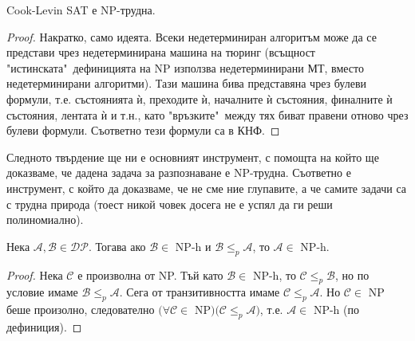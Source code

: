 \begin{boxtheorem}{Cook-Levin}{}
	SAT е NP-трудна.
\end{boxtheorem}
\begin{proof}
	Накратко, само идеята. Всеки недетерминиран алгоритъм може да се представи чрез недетерминирана машина на тюринг (всъщност "истинската"\ дефиницията на NP използва недетерминирани МТ, вместо недетерминирани алгоритми). Тази машина бива представяна чрез булеви формули, т.е. състоянията ѝ, преходите ѝ, началните ѝ състояния, финалните ѝ състояния, лентата ѝ и т.н., като "връзките"\ между тях биват правени отново чрез булеви формули. Съответно тези формули са в КНФ.
\end{proof}\vspace{0.3cm}

\noindent
Следното твърдение ще ни е основният инструмент, с помощта на който ще доказваме, че дадена задача за разпознаване е NP-трудна. Съответно е инструмент, с който да доказваме, че не сме ние глупавите, а че самите задачи са с трудна природа (тоест никой човек досега не е успял да ги реши полиномиално).
\begin{boxproposition}{}{}
	Нека $\mathcal{A},\mathcal{B}\in\mathcal{DP}$. Тогава ако $\mathcal{B}\in$ NP-h и $\mathcal{B}\le_p\mathcal{A}$, то $\mathcal{A}\in$ NP-h.
\end{boxproposition}
\begin{proof}
	Нека $\mathcal{C}$ е произволна от NP. Тъй като $\mathcal{B}\in$ NP-h, то $\mathcal{C}\le_p\mathcal{B}$, но по условие имаме $\mathcal{B}\le_p\mathcal{A}$. Сега от транзитивността имаме $\mathcal{C}\le_p\mathcal{A}$. Но $\mathcal{C}\in$ NP беше произолно, следователно $\big(\forall\mathcal{C}\in$ NP$\big)\big(\mathcal{C}\le_p\mathcal{A}\big)$, т.е. $\mathcal{A}\in$ NP-h (по дефиниция).
\end{proof}